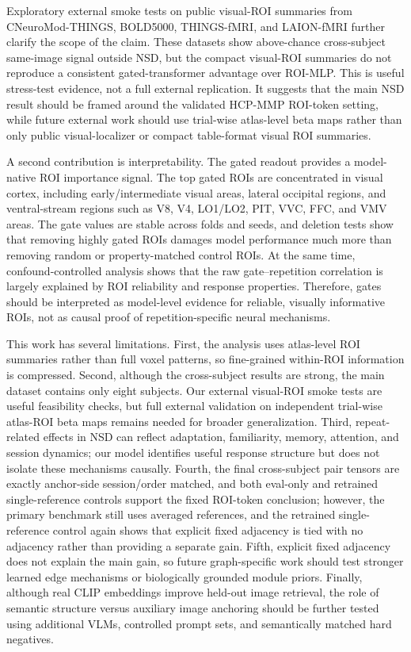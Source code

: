 \documentclass{article}
\begin{document}
Exploratory external smoke tests on public visual-ROI summaries from CNeuroMod-THINGS, BOLD5000, THINGS-fMRI, and LAION-fMRI further clarify the scope of the claim. These datasets show above-chance cross-subject same-image signal outside NSD, but the compact visual-ROI summaries do not reproduce a consistent gated-transformer advantage over ROI-MLP. This is useful stress-test evidence, not a full external replication. It suggests that the main NSD result should be framed around the validated HCP-MMP ROI-token setting, while future external work should use trial-wise atlas-level beta maps rather than only public visual-localizer or compact table-format visual ROI summaries.

A second contribution is interpretability. The gated readout provides a model-native ROI importance signal. The top gated ROIs are concentrated in visual cortex, including early/intermediate visual areas, lateral occipital regions, and ventral-stream regions such as V8, V4, LO1/LO2, PIT, VVC, FFC, and VMV areas. The gate values are stable across folds and seeds, and deletion tests show that removing highly gated ROIs damages model performance much more than removing random or property-matched control ROIs. At the same time, confound-controlled analysis shows that the raw gate--repetition correlation is largely explained by ROI reliability and response properties. Therefore, gates should be interpreted as model-level evidence for reliable, visually informative ROIs, not as causal proof of repetition-specific neural mechanisms.

This work has several limitations. First, the analysis uses atlas-level ROI summaries rather than full voxel patterns, so fine-grained within-ROI information is compressed. Second, although the cross-subject results are strong, the main dataset contains only eight subjects. Our external visual-ROI smoke tests are useful feasibility checks, but full external validation on independent trial-wise atlas-ROI beta maps remains needed for broader generalization. Third, repeat-related effects in NSD can reflect adaptation, familiarity, memory, attention, and session dynamics; our model identifies useful response structure but does not isolate these mechanisms causally. Fourth, the final cross-subject pair tensors are exactly anchor-side session/order matched, and both eval-only and retrained single-reference controls support the fixed ROI-token conclusion; however, the primary benchmark still uses averaged references, and the retrained single-reference control again shows that explicit fixed adjacency is tied with no adjacency rather than providing a separate gain. Fifth, explicit fixed adjacency does not explain the main gain, so future graph-specific work should test stronger learned edge mechanisms or biologically grounded module priors. Finally, although real CLIP embeddings improve held-out image retrieval, the role of semantic structure versus auxiliary image anchoring should be further tested using additional VLMs, controlled prompt sets, and semantically matched hard negatives.
\end{document}
